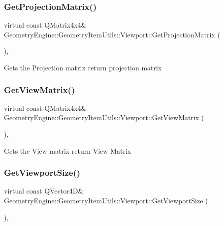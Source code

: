 \subsubsection{\texorpdfstring{GetProjectionMatrix()}{GetProjectionMatrix()}}
{\footnotesize\ttfamily virtual const Q\+Matrix4x4\& Geometry\+Engine\+::\+Geometry\+Item\+Utils\+::\+Viewport\+::\+Get\+Projection\+Matrix (\begin{DoxyParamCaption}{ }\end{DoxyParamCaption})\hspace{0.3cm}{\ttfamily [inline]}, {\ttfamily [virtual]}}

Gets the Projection matrix return projection matrix \mbox{\label{class_geometry_engine_1_1_geometry_item_utils_1_1_viewport_ac3c9ce922326ed25d5ffa8d3c7ffc0ca}} 
\subsubsection{\texorpdfstring{GetViewMatrix()}{GetViewMatrix()}}
{\footnotesize\ttfamily virtual const Q\+Matrix4x4\& Geometry\+Engine\+::\+Geometry\+Item\+Utils\+::\+Viewport\+::\+Get\+View\+Matrix (\begin{DoxyParamCaption}{ }\end{DoxyParamCaption})\hspace{0.3cm}{\ttfamily [inline]}, {\ttfamily [virtual]}}

Gets the View matrix return View Matrix \mbox{\label{class_geometry_engine_1_1_geometry_item_utils_1_1_viewport_a0b5e2284b8a56be19d9f39a1b88c5eba}} 
\subsubsection{\texorpdfstring{GetViewportSize()}{GetViewportSize()}}
{\footnotesize\ttfamily virtual const Q\+Vector4D\& Geometry\+Engine\+::\+Geometry\+Item\+Utils\+::\+Viewport\+::\+Get\+Viewport\+Size (\begin{DoxyParamCaption}{ }\end{DoxyParamCaption})\hspace{0.3cm}{\ttfamily [inline]}, {\ttfamily [virtual]}}

